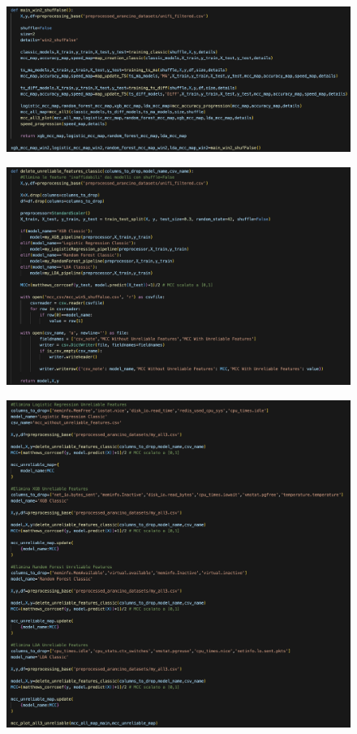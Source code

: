 \begin{appendices}
\begin{figure}[H]
    \centering
    \includegraphics[width=1\linewidth]{29.png}
    \label{fig:enter-label}
\end{figure}

\begin{figure}[H]
    \centering
    \includegraphics[width=1\linewidth]{30.png}
    \label{fig:enter-label}
\end{figure}

\begin{figure}[H]
    \centering
    \includegraphics[width=1\linewidth]{31.png}
    \label{fig:enter-label}
\end{figure}


\end{appendices}

